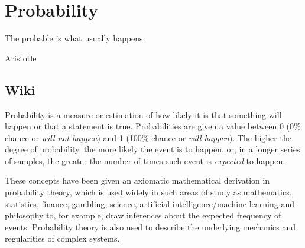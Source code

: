 \section{Probability}

\epigraph{The probable is what usually happens.}{Aristotle}{}


\subsection{Wiki}
Probability is a measure or estimation of how likely it is that something will happen or that a statement is true. Probabilities are given a value between 0 (0\% chance or \emph{will not happen}) and 1 (100\% chance or \emph{will happen}). The higher the degree of probability, the more likely the event is to happen, or, in a longer series of samples, the greater the number of times such event is \emph{expected} to happen.

These concepts have been given an axiomatic mathematical derivation in probability theory, which is used widely in such areas of study as mathematics, statistics, finance, gambling, science, artificial intelligence/machine learning and philosophy to, for example, draw inferences about the expected frequency of events. Probability theory is also used to describe the underlying mechanics and regularities of complex systems.


